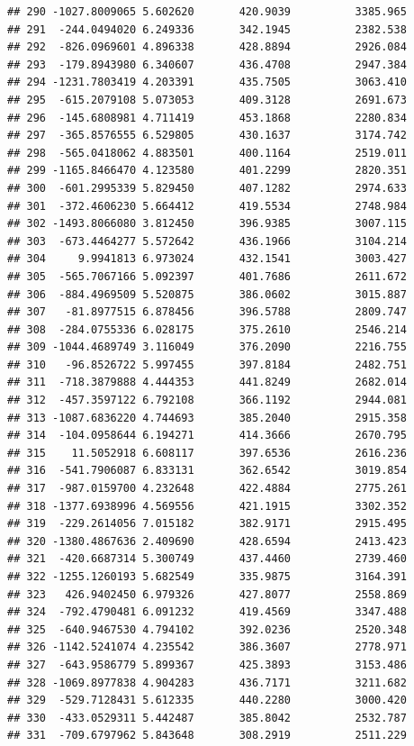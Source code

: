 \documentclass[
]{article}
\begin{document}
\begin{verbatim}
## 290 -1027.8009065 5.602620       420.9039          3385.965
## 291  -244.0494020 6.249336       342.1945          2382.538
## 292  -826.0969601 4.896338       428.8894          2926.084
## 293  -179.8943980 6.340607       436.4708          2947.384
## 294 -1231.7803419 4.203391       435.7505          3063.410
## 295  -615.2079108 5.073053       409.3128          2691.673
## 296  -145.6808981 4.711419       453.1868          2280.834
## 297  -365.8576555 6.529805       430.1637          3174.742
## 298  -565.0418062 4.883501       400.1164          2519.011
## 299 -1165.8466470 4.123580       401.2299          2820.351
## 300  -601.2995339 5.829450       407.1282          2974.633
## 301  -372.4606230 5.664412       419.5534          2748.984
## 302 -1493.8066080 3.812450       396.9385          3007.115
## 303  -673.4464277 5.572642       436.1966          3104.214
## 304     9.9941813 6.973024       432.1541          3003.427
## 305  -565.7067166 5.092397       401.7686          2611.672
## 306  -884.4969509 5.520875       386.0602          3015.887
## 307   -81.8977515 6.878456       396.5788          2809.747
## 308  -284.0755336 6.028175       375.2610          2546.214
## 309 -1044.4689749 3.116049       376.2090          2216.755
## 310   -96.8526722 5.997455       397.8184          2482.751
## 311  -718.3879888 4.444353       441.8249          2682.014
## 312  -457.3597122 6.792108       366.1192          2944.081
## 313 -1087.6836220 4.744693       385.2040          2915.358
## 314  -104.0958644 6.194271       414.3666          2670.795
## 315    11.5052918 6.608117       397.6536          2616.236
## 316  -541.7906087 6.833131       362.6542          3019.854
## 317  -987.0159700 4.232648       422.4884          2775.261
## 318 -1377.6938996 4.569556       421.1915          3302.352
## 319  -229.2614056 7.015182       382.9171          2915.495
## 320 -1380.4867636 2.409690       428.6594          2413.423
## 321  -420.6687314 5.300749       437.4460          2739.460
## 322 -1255.1260193 5.682549       335.9875          3164.391
## 323   426.9402450 6.979326       427.8077          2558.869
## 324  -792.4790481 6.091232       419.4569          3347.488
## 325  -640.9467530 4.794102       392.0236          2520.348
## 326 -1142.5241074 4.235542       386.3607          2778.971
## 327  -643.9586779 5.899367       425.3893          3153.486
## 328 -1069.8977838 4.904283       436.7171          3211.682
## 329  -529.7128431 5.612335       440.2280          3000.420
## 330  -433.0529311 5.442487       385.8042          2532.787
## 331  -709.6797962 5.843648       308.2919          2511.229

\end{verbatim}
\end{document}
